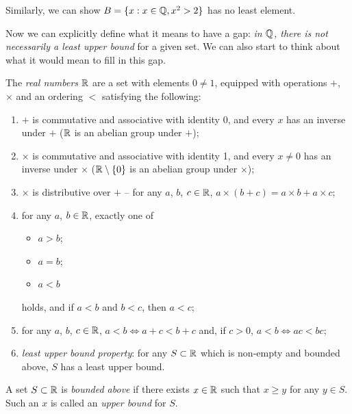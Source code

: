 \documentclass{../../template/note}
\begin{document}
    \begin{remark*}
        Similarly, we can show \(B = \{x: x \in \mathbb Q, x^2 > 2\}\) has no least element.
    \end{remark*}
    
    Now we can explicitly define what it means to have a gap: \emph{in \(\mathbb Q\), there is not necessarily a least upper bound} for a given set. We can also start to think about what it would mean to fill in this gap.
    
    \begin{definition}
        The \emph{real numbers} \(\mathbb R\) are a set with elements \(0 \neq 1\), equipped with operations \(+\), \(\times\) and an ordering \(<\) satisfying the following:
        \begin{enumerate}[label=\protect\circled{\arabic*}]
            \item \(+\) is commutative and associative with identity 0, and every \(x\) has an inverse under \(+\) (\(\mathbb R\) is an abelian group under \(+\));
            \item \(\times\) is commutative and associative with identity 1, and every \(x \neq 0\) has an inverse under \(\times\) (\(\mathbb R \setminus \{0\}\) is an abelian group under \(\times\));
            \item \(\times\) is distributive over \(+\) -- for any \(a\), \(b\), \(c \in \mathbb R\), \(a \times (b + c) = a \times b + a \times c\);
            \item for any \(a\), \(b \in \mathbb R\), exactly one of
            \begin{itemize}
                \item \(a > b\);
                \item \(a = b\);
                \item \(a < b\)
            \end{itemize}
            holds, and if \(a < b\) and \(b < c\), then \(a < c\);
            \item for any \(a\), \(b\), \(c \in \mathbb R\), \(a < b \iff a + c < b + c\) and, if \(c > 0\), \(a < b \iff ac < bc\);
            \item \emph{least upper bound property}: for any \(S \subset \mathbb R\) which is non-empty and bounded above, \(S\) has a least upper bound.
        \end{enumerate}
    \end{definition}
    
    \begin{definition}
        A set \(S \subset \mathbb R\) is \emph{bounded above} if there exists \(x \in \mathbb R\) such that \(x \geq y\) for any \(y \in S\). Such an \(x\) is called an \emph{upper bound} for \(S\).
    \end{definition}
    
\end{document}
